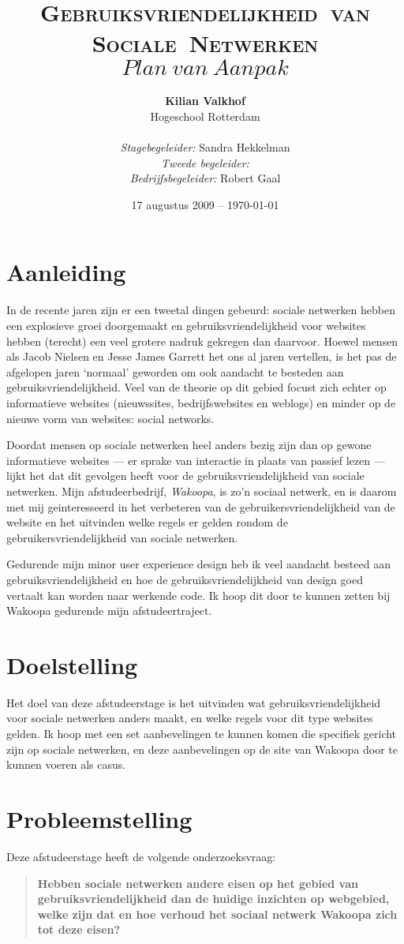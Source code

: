 \documentclass[a4paper, 10pt, pdftex]{article}
\title{\textsc{Gebruiksvriendelijkheid~van Sociale~Netwerken} \linebreak $Plan~van~Aanpak$}
\author{\textbf{Kilian Valkhof}\\
  Hogeschool Rotterdam\\
  \\
  \textit{Stagebegeleider:} Sandra Hekkelman\\
  \textit{Tweede begeleider:}\\
  \textit{Bedrijfsbegeleider:} Robert Gaal}
\date{17 augustus 2009 -- \today}
\begin{document}
  \normalem
  \maketitle

  \newpage
  \tableofcontents

  \newpage
\section{Aanleiding}
In de recente jaren zijn er een tweetal dingen gebeurd: sociale netwerken hebben een explosieve groei doorgemaakt
en gebruiksvriendelijkheid voor websites hebben (terecht) een veel grotere nadruk gekregen dan daarvoor. Hoewel mensen
als Jacob Nielsen en Jesse James Garrett het ons al jaren vertellen, is het pas de afgelopen jaren `normaal' geworden
om ook aandacht te besteden aan gebruiksvriendelijkheid. Veel van de theorie op dit gebied focust zich echter op
informatieve websites (nieuwssites, bedrijfswebsites en weblogs) en minder op de nieuwe vorm van websites: social networks.

Doordat mensen op sociale netwerken heel anders bezig zijn dan op gewone informatieve websites --- er sprake van interactie in plaats van passief lezen ---
lijkt het dat dit gevolgen heeft voor de gebruiksvriendelijkheid
van sociale netwerken. Mijn afstudeerbedrijf, \emph{Wakoopa}, is zo'n sociaal netwerk, en is daarom met mij geinteresseerd in het verbeteren
van de gebruikersvriendelijkheid van de website en het uitvinden welke regels er gelden rondom de gebruikersvriendelijkheid van sociale netwerken.

Gedurende mijn minor user experience design heb ik veel aandacht besteed aan gebruiksvriendelijkheid en hoe de gebruiksvriendelijkheid van design
goed vertaalt kan worden naar werkende code. Ik hoop dit door te kunnen zetten bij Wakoopa gedurende mijn afstudeertraject.

\section{Doelstelling}
Het doel van deze afstudeerstage is het uitvinden wat gebruiksvriendelijkheid voor sociale netwerken anders maakt, en welke regels voor dit type websites gelden.
Ik hoop met een set aanbevelingen te kunnen komen die specifiek gericht zijn op sociale netwerken, en deze aanbevelingen op de site van Wakoopa door te kunnen voeren als casus.


\section{Probleemstelling}
Deze afstudeerstage heeft de volgende onderzoeksvraag:
\begin{quotation}
 \textbf{Hebben sociale netwerken andere eisen op het gebied van gebruiksvriendelijkheid dan de huidige inzichten op webgebied, welke zijn dat en hoe verhoud het sociaal netwerk Wakoopa zich tot deze eisen?}
\end{quotation}
\end{document}
